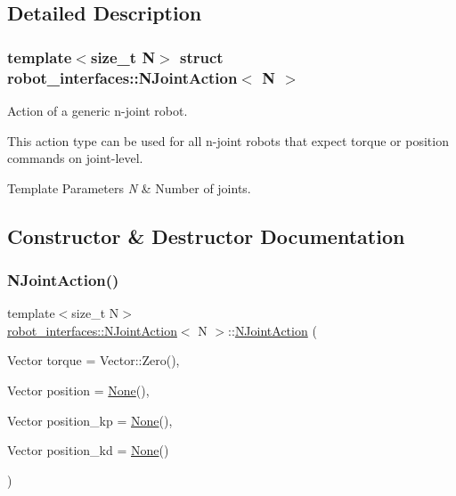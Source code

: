 \subsection{Detailed Description}
\subsubsection*{template$<$size\+\_\+t N$>$\newline
struct robot\+\_\+interfaces\+::\+N\+Joint\+Action$<$ N $>$}

Action of a generic n-\/joint robot. 

This action type can be used for all n-\/joint robots that expect torque or position commands on joint-\/level.


\begin{DoxyTemplParams}{Template Parameters}
{\em N} & Number of joints. \\
\hline
\end{DoxyTemplParams}


\subsection{Constructor \& Destructor Documentation}
\mbox{\label{structrobot__interfaces_1_1NJointAction_a518f1d5bd4161809c176a4007f58fb0d}} 
\subsubsection{\texorpdfstring{N\+Joint\+Action()}{NJointAction()}}
{\footnotesize\ttfamily template$<$size\+\_\+t N$>$ \\
\hyperlink{structrobot__interfaces_1_1NJointAction}{robot\+\_\+interfaces\+::\+N\+Joint\+Action}$<$ N $>$\+::\hyperlink{structrobot__interfaces_1_1NJointAction}{N\+Joint\+Action} (\begin{DoxyParamCaption}\item[{Vector}]{torque = {\ttfamily Vector\+:\+:Zero()},  }\item[{Vector}]{position = {\ttfamily \hyperlink{structrobot__interfaces_1_1NJointAction_abb5403bb946dc4b9e9e5e13b9195ad86}{None}()},  }\item[{Vector}]{position\+\_\+kp = {\ttfamily \hyperlink{structrobot__interfaces_1_1NJointAction_abb5403bb946dc4b9e9e5e13b9195ad86}{None}()},  }\item[{Vector}]{position\+\_\+kd = {\ttfamily \hyperlink{structrobot__interfaces_1_1NJointAction_abb5403bb946dc4b9e9e5e13b9195ad86}{None}()} }\end{DoxyParamCaption})\hspace{0.3cm}{\ttfamily [inline]}}



